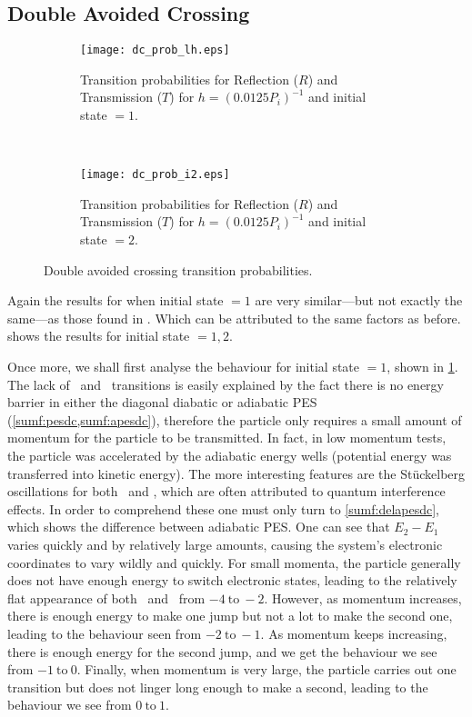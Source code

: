 \subsection*{Double Avoided Crossing}
%
\begin{figure}
\begin{subfigure}[t]{0.5\textwidth}
\centering
\texttt{[image: dc\_prob\_lh.eps]}
\caption[]{Transition probabilities for Reflection ($ R $) and Transmission ($ T $) for $ h = (0.0125P_{i})^{-1} $ and initial state $ = 1 $.}
\label{sumf:dci1}
\end{subfigure}
~
\begin{subfigure}[t]{0.5\textwidth}
\centering
\texttt{[image: dc\_prob\_i2.eps]}
\caption[]{Transition probabilities for Reflection ($ R $) and Transmission ($ T $) for $ h = (0.0125P_{i})^{-1} $ and initial state $ = 2 $.}
\label{sumf:dci2}
\end{subfigure}
\caption[]{Double avoided crossing transition probabilities.}\label{sumf:dc}
\end{figure}

Again the results for when initial state $ = 1 $ are very similar---but not exactly the same---as those found in \cite{project}. Which can be attributed to the same factors as before.  shows the results for initial state $ = 1, 2 $.

Once more, we shall first analyse the behaviour for initial state $ = 1 $, shown in \cref{sumf:dci1}. The lack of \roo~and \rto~transitions is easily explained by the fact there is no energy barrier in either the diagonal diabatic or adiabatic PES (\cref{sumf:pesdc,sumf:apesdc}), therefore the particle only requires a small amount of momentum for the particle to be transmitted. In fact, in low momentum tests, the particle was accelerated by the adiabatic energy wells (potential energy was transferred into kinetic energy). The more interesting features are the Stückelberg oscillations for both \too~and \tto, which are often attributed to quantum interference effects. In order to comprehend these one must only turn to \cref{sumf:delapesdc}, which shows the difference between adiabatic PES. One can see that $ E_{2} - E_{1} $ varies quickly and by relatively large amounts, causing the system's electronic coordinates to vary wildly and quickly. For small momenta, the particle generally does not have enough energy to switch electronic states, leading to the relatively flat appearance of both \too~and \tto~from $ -4~\text{to}~-2 $. However, as momentum increases, there is enough energy to make one jump but not a lot to make the second one, leading to the behaviour seen from $ -2~\text{to}~-1 $. As momentum keeps increasing, there is enough energy for the second jump, and we get the behaviour we see from $ -1~\text{to}~0 $. Finally, when momentum is very large, the particle carries out one transition but does not linger long enough to make a second, leading to the behaviour we see from $ 0~\text{to}~1 $.

